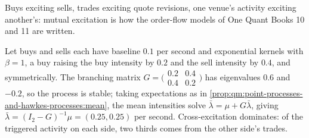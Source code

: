 Buys exciting sells, trades exciting quote revisions, one venue's activity exciting another's: mutual
excitation is how the order-flow models of One Quant Books 10 and 11 are written.

\begin{example}\label{ex:qm:point-processes-and-hawkes-processes:bivariate}
Let buys and sells each have baseline $0.1$ per second and exponential kernels with $\beta = 1$, a buy raising the
buy intensity by $0.2$ and the sell intensity by $0.4$, and symmetrically. The branching matrix $G = \bigl(\begin{smallmatrix}0.2 &
0.4\\0.4 & 0.2\end{smallmatrix}\bigr)$ has eigenvalues $0.6$ and $-0.2$, so the process is stable; taking expectations as in
\cref{prop:qm:point-processes-and-hawkes-processes:mean}, the mean intensities solve $\bar\lambda = \mu + G\bar\lambda$, giving
$\bar\lambda = (I_2 - G)^{-1}\mu = (0.25, 0.25)$ per second. Cross-excitation dominates: of the triggered activity on each side,
two thirds comes from the other side's trades.
\end{example}

